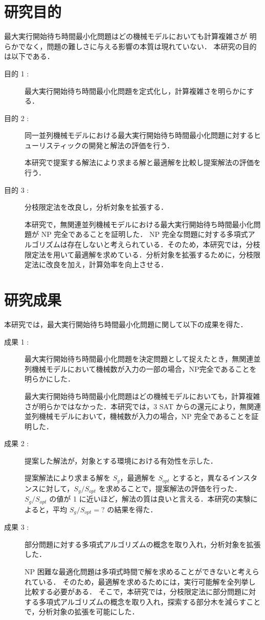 \documentclass[12pt]{optlab-bachelor}
\begin{document}
\section{研究目的}
最大実行開始待ち時間最小化問題はどの機械モデルにおいても計算複雑さが
明らかでなく，問題の難しさに与える影響の本質は現れていない．
本研究の目的は以下である．
\begin{description}
  \item[目的 1 : ]
  最大実行開始待ち時間最小化問題を定式化し，計算複雑さを明らかにする．

  \item[目的 2 : ]
  同一並列機械モデルにおける最大実行開始待ち時間最小化問題に対するヒューリスティックの開発と解法の評価を行う．

  本研究で提案する解法により求まる解と最適解を比較し提案解法の評価を行う．

  \item[目的 3 : ]
  分枝限定法を改良し，分析対象を拡張する．

  本研究で，無関連並列機械モデルにおける最大実行開始待ち時間最小化問題が NP 完全であることを証明した．
  NP 完全な問題に対する多項式アルゴリズムは存在しないと考えられている．そのため，本研究では，分枝限定法を用いて最適解を求めている．分析対象を拡張するために，分枝限定法に改良を加え，計算効率を向上させる．
\end{description}

\section{研究成果}
本研究では，最大実行開始待ち時間最小化問題に関して以下の成果を得た．
\begin{description}
  \item[成果 1 : ]
  最大実行開始待ち時間最小化問題を決定問題として捉えたとき，無関連並列機械モデルにおいて機械数が入力の一部の場合，NP完全であることを明らかにした．

  最大実行開始待ち時間最小化問題はどの機械モデルにおいても，計算複雑さが明らかではなかった．本研究では，3 SAT からの還元により，無関連並列機械モデルにおいて，機械数が入力の場合，NP 完全であることを証明した．
  \item[成果 2 : ]
  提案した解法が，対象とする環境における有効性を示した．

  提案解法により求まる解を $S_g$，最適解を $S_{opt}$ とすると，異なるインスタンスに対して，$S_g/S_{opt}$ を求めることで，提案解法の評価を行った．$S_g/S_{opt}$ の値が 1 に近いほど，解法の質は良いと言える．本研究の実験によると，平均 $S_g/S_{opt} = ?$ の結果を得た．

  \item[成果 3 : ]
  部分問題に対する多項式アルゴリズムの概念を取り入れ，分析対象を拡張した．

  NP 困難な最適化問題は多項式時間で解を求めることができないと考えられている．
  そのため，最適解を求めるためには，実行可能解を全列挙し比較する必要がある．
  そこで，本研究では，分枝限定法に部分問題に対する多項式アルゴリズムの概念を取り入れ，探索する部分木を減らすことで，分析対象の拡張を可能にした．
\end{description}
\end{document}

